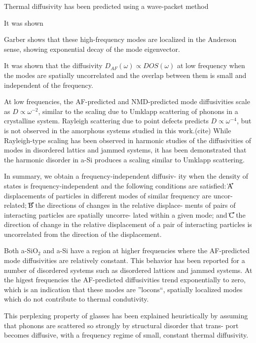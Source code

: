 \documentclass[aps,prb,twocolumn,superscriptaddress,footinbib,amsmath,amssymb,floatfix]{revtex4}
\begin{document}
Thermal diffusivity has been predicted using a wave-packet method

It was shown 

Garber shows that these high-frequency modes are localized in the 
Anderson sense, showing exponential decay of the mode eigenvector.
\cite{garber_numerical_2001}

It was shown that the diffusivity $D_{AF}(\omega) \propto DOS(\omega)$ 
at low frequency when the modes are spatially uncorrelated and the 
overlap between them is small and independent of the frequency.
\cite{vitelli_heat_2010,xu_energy_2009}

At low frequencies, the AF-predicted and NMD-predicted mode 
diffusivities scale as $D \propto \omega^{-2}$, similar to the scaling 
due to Umklapp scattering of phonons in a crystalline system. Rayleigh 
scattering due to point defects predicts $D \propto \omega^{-4}$, 
but is not observed in the amorphous systems studied in this work.(cite) 
While Rayleigh-type scaling has been 
observed in harmonic studies of the diffusivities of modes in 
disordered lattics and jammed systems,
\cite{sheng_heat_1991,xu_energy_2009,vitelli_heat_2010} 
it has been demonstrated that the harmonic disorder in a-Si 
produces a scaling similar to Umklapp scattering.
\cite{feldman_thermal_1993}

In summary, we obtain a frequency-independent diffusiv-
ity when the density of states is frequency-independent and
the following conditions are satisfied: ͑A͒ displacements of
particles in different modes of similar frequency are uncor-
related; ͑B͒ the directions of changes in the relative displace-
ments of pairs of interacting particles are spatially uncorre-
lated within a given mode; and ͑C͒ the direction of change in
the relative displacement of a pair of interacting particles is
uncorrelated from the direction of the displacement.

Both a-SiO$_2$ and a-Si have a region at higher frequencies where the 
AF-predicted mode diffusivities are relatively constant. This behavior 
has been reported for a number of disordered systems such as 
disordered lattices
\cite{sheng_heat_1991,beltukov_ioffe-regel_2013,larkin_predicting_2013} 
and jammed systems. At the higest frequencies the AF-predicted 
diffusivities trend exponentially to zero, which is an indication 
that these modes are ''locons``, spatially localized modes which 
do not contribute to thermal condutivity.\cite{allen_diffusons_1999} 

This perplexing property of glasses
has been explained heuristically by assuming that phonons
are scattered so strongly by structural disorder that trans-
port becomes diffusive, with a frequency regime of small,
constant thermal diffusivity.
\cite{kittel_interpretation_1949,sheng_heat_1991,allen_} 
\end{document}

